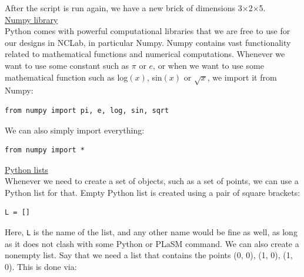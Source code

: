 \noindent
After the script is run again, we have a new brick of dimensions 3$\times$2$\times$5.\\

\noindent
\underline{Numpy library}\\

\noindent
Python comes with powerful computational libraries that we are free to use 
for our designs in NCLab, 
in particular Numpy. Numpy contains vast functionality related to 
mathematical functions and numerical computations. Whenever we want 
to use some constant such as $\pi$ or $e$, or when we want to use some 
mathematical function such as log$(x)$, sin$(x)$ or $\sqrt{x}$, we
import it from Numpy:\\

\begin{bbox}
\begin{verbatim}
from numpy import pi, e, log, sin, sqrt
\end{verbatim}
\end{bbox} 
\vspace{6mm}

\noindent
We can also simply import everything:\\

\begin{bbox}
\begin{verbatim}
from numpy import *
\end{verbatim}
\end{bbox} 
\vspace{6mm}

\noindent
\underline{Python lists}\\

\noindent
Whenever we need to create a set of objects, such as a set of points, we can use 
a Python list for that. Empty Python list is created using a pair of square brackets:\\

\begin{bbox}
\begin{verbatim}
L = []
\end{verbatim}
\end{bbox} 
\vspace{6mm}

\noindent
Here, {\tt L} is the name of the list, and any other name would be fine as well, 
as long as it does not clash with some Python or PLaSM command. We can also create 
a nonempty list. Say that we need a list that contains the points (0, 0), (1, 0),
(1, 0). This is done via:\\

